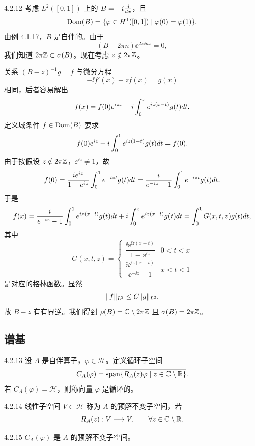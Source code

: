 \begin{example}{4.2.12}
  考虑 $L^2([0,1])$ 上的 $B=-i\frac{d}{d x}$，且
  \[
  \operatorname{Dom}(B)=\{\varphi\in H^1([0,1])\mid\varphi(0)=\varphi(1)\}.
  \]
  由例 4.1.17，$B$ 是自伴的。由于
  \[
  (B-2\pi n)\ee^{2\pi\ii nx}=0,
  \]
  我们知道 $2\pi\mathbb{Z}\subset\sigma(B)$。现在考虑 $z\notin 2\pi\mathbb{Z}$。

  关系 $(B-z)^{-1}g=f$ 与微分方程
  \[
  -\ii f'(x)-zf(x)=g(x)
  \]
  相同，后者容易解出
  \[
  f(x)=f(0)e^{i zx}+i\int_0^xe^{i z(x-t)}g(t)d t.
  \]
  定义域条件 $f\in\operatorname{Dom}(B)$ 要求
  \[
  f(0)e^{i z}+i\int_0^1e^{i z(1-t)}g(t)d t=f(0).
  \]
  由于按假设 $z\notin 2\pi\mathbb{Z}$，$\ee^{\ii z}\ne 1$，故
  \[
  f(0)=\frac{ie^{i z}}{1-e^{i z}}\int_0^1e^{-i zt}g(t)d t
  =\frac{i}{e^{-i z}-1}\int_0^1e^{-i zt}g(t)d t.
  \]
  于是
  \[
  f(x)=\frac{i}{e^{-i z}-1}\int_0^1e^{i z(x-t)}g(t)d t
  +i\int_0^xe^{i z(x-t)}g(t)d t
  =\int_0^1 G(x,t,z)g(t)d t,
  \]
  其中
  \[
  G(x,t,z)=
  \begin{cases}
  \dfrac{\ii\ee^{\ii z(x-t)}}{1-\ee^{\ii z}}&0<t<x\\[4mm]
  \dfrac{\ii\ee^{\ii z(x-t)}}{\ee^{-\ii z}-1}&x<t<1
  \end{cases}
  \]
  是对应的格林函数。显然
  \[
  \lVert f\rVert_{L^2}\le C\lVert g\rVert_{L^2}.
  \]
  故 $B-z$ 有有界逆。我们得到 $\rho(B)=\mathbb{C}\setminus 2\pi\mathbb{Z}$ 且 $\sigma(B)=2\pi\mathbb{Z}$。
\end{example}

\subsection{谱基}

\begin{definition}{4.2.13}
  设 $A$ 是自伴算子，$\varphi\in\mathcal{H}$。定义循环子空间
  \[
  C_A(\varphi)=\overline{\operatorname{span}\{R_A(z)\varphi\mid z\in\mathbb{C}\setminus\mathbb{R}\}}.
  \]
  若 $C_A(\varphi)=\mathcal{H}$，则称向量 $\varphi$ 是循环的。
\end{definition}

\begin{definition}{4.2.14}
  线性子空间 $V\subset\mathcal{H}$ 称为 $A$ 的预解不变子空间，若
  \[
  R_A(z):V\longrightarrow V,\qquad\forall z\in\mathbb{C}\setminus\mathbb{R}.
  \]
\end{definition}

\begin{proposition}{4.2.15}
  $C_A(\varphi)$ 是 $A$ 的预解不变子空间。
\end{proposition}

